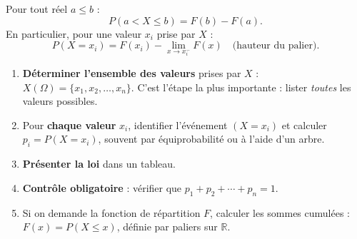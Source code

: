 \documentclass[11pt]{article}
\newcommand{\cle}[1]{{\popxbold\color{popdark}#1}}
\begin{document}
\begin{propriete}
Pour tout réel $a \leq b$ :
\[ P(a < X \leq b) = F(b) - F(a). \]
En particulier, pour une valeur $x_i$ prise par $X$ :
\[ P(X = x_i) = F(x_i) - \lim_{x \to x_i^-} F(x) \quad \text{(hauteur du palier)}. \]
\end{propriete}

\begin{methode}
\begin{enumerate}
\item \textbf{Déterminer l'ensemble des valeurs} prises par $X$ : $X(\Omega) = \{x_1, x_2, \ldots, x_n\}$. C'est l'étape la plus importante : lister \emph{toutes} les valeurs possibles.
\item Pour \textbf{chaque valeur} $x_i$, identifier l'événement $(X = x_i)$ et calculer $p_i = P(X = x_i)$, souvent par équiprobabilité ou à l'aide d'un arbre.
\item \textbf{Présenter la loi} dans un tableau.
\item \textbf{Contrôle obligatoire} : vérifier que $p_1 + p_2 + \cdots + p_n = 1$.
\item Si on demande la \cle{fonction de répartition} $F$, calculer les sommes cumulées : $F(x) = P(X \leq x)$, définie par paliers sur $\mathbb{R}$.
\end{enumerate}
\end{methode}
\end{document}
